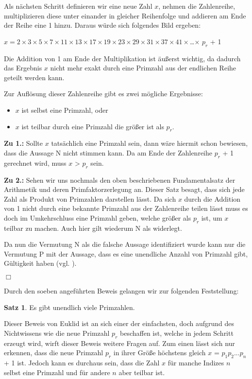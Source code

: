 \documentclass[12pt,a4paper]{article}
\theoremstyle{definition}
\newtheorem{satz}{Satz}[subsection]
\begin{document}
Als nächsten Schritt definieren wir eine neue Zahl $x$, nehmen die Zahlenreihe, multiplizieren diese unter einander in gleicher Reihenfolge und addieren am Ende der Reihe eine 1 hinzu.
Daraus würde sich folgendes Bild ergeben:

\begin{center}
$x = 2\times3\times5\times7\times11\times13\times17\times19\times23\times29\times31\times37\times41\times$…$\times$ $p_r$ + 1
\end{center}

Die Addition von 1 am Ende der Multiplikation ist äußerst wichtig, da dadurch das Ergebnis $x$ nicht mehr exakt durch eine Primzahl aus der endlichen Reihe geteilt werden kann.

Zur Auflösung dieser Zahlenreihe gibt es zwei mögliche Ergebnisse:
\begin{itemize}
\item[1.] $x$ ist selbst eine Primzahl, oder
\item[2.] $x$ ist teilbar durch eine Primzahl die größer ist als $p_r$.
\end{itemize}
\textbf{Zu 1.:} Sollte $x$ tatsächlich eine Primzahl sein, dann wäre hiermit schon bewiesen, dass die Aussage N nicht stimmen kann.
Da am Ende der Zahlenreihe $p_r$ + 1 gerechnet wird, muss $x$ > $p_r$ sein.

\textbf{Zu 2.:} Sehen wir uns nochmals den oben beschriebenen Fundamentalsatz der Arithmetik und deren Primfaktorzerlegung an.
Dieser Satz besagt, dass sich jede Zahl als Produkt von Primzahlen darstellen lässt.
Da sich $x$ durch die Addition von 1 nicht durch eine bekannte Primzahl aus der Zahlenreihe teilen lässt muss es doch im Umkehrschluss eine Primzahl geben, welche größer als $p_r$ ist, um $x$ teilbar zu machen.
Auch hier gilt wiederum N als widerlegt.

Da nun die Vermutung N als die falsche Aussage identifiziert wurde kann nur die Vermutung P mit der Aussage, dass es eine unendliche Anzahl von Primzahl gibt, Gültigkeit haben (vgl. \cite[3]{Ribenboim2006}).
\begin{flushright}
$\Box$
\end{flushright}

Durch den soeben angeführten Beweis gelangen wir zur folgenden Feststellung:
\begin{satz}Es gibt unendlich viele Primzahlen.\end{satz}

Dieser Beweis von Euklid ist an sich einer der einfachsten, doch aufgrund des Nichtwissens wie die neue Primzahl $p_r$ beschaffen ist, welche in jedem Schritt erzeugt wird, wirft dieser Beweis weitere Fragen auf.
Zum einen lässt sich nur erkennen, dass die neue Primzahl $p_r$ in ihrer Größe höchstens gleich\newline
$x$ = $p_1p_2...p_n$ + 1 ist. Jedoch kann es durchaus sein, dass die Zahl $x$ für manche Indizes $n$ selbst eine Primzahl und für andere $n$ aber teilbar ist.
\end{document}
